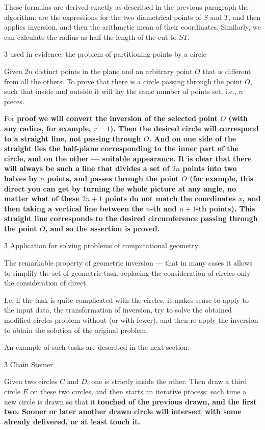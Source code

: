 These formulas are derived exactly as described in the previous paragraph the algorithm: are the expressions for the two diametrical points of $S$ and $T$, and then applies inversion, and then the arithmetic mean of their coordinates. Similarly, we can calculate the radius as half the length of the cut to $ST$.


\h3{ used in evidence: the problem of partitioning points by a circle }

Given $2n$ distinct points in the plane and an arbitrary point $O$ that is different from all the others. To prove that there is a circle passing through the point $O$, such that inside and outside it will lay the same number of points set, i.e., $n$ pieces.

For \bf{proof} we will convert the inversion of the selected point $O$ (with any radius, for example, $r=1$). Then the desired circle will correspond to a straight line, not passing through $O$. And on one side of the straight lies the half-plane corresponding to the inner part of the circle, and on the other --- suitable appearance. It is clear that there will always be such a line that divides a set of $2n$ points into two halves by $n$ points, and passes through the point $O$ (for example, this direct you can get by turning the whole picture at any angle, no matter what of these $2n+1$ points do not match the coordinates $x$, and then taking a vertical line between the $n$-th and $n+1$-th points). This straight line corresponds to the desired circumference passing through the point $O$, and so the assertion is proved.


\h3{ Application for solving problems of computational geometry }

The remarkable property of geometric inversion --- that in many cases it allows to simplify the set of geometric task, replacing the consideration of circles only the consideration of direct.

I.e. if the task is quite complicated with the circles, it makes sense to apply to the input data, the transformation of inversion, try to solve the obtained modified circles problem without (or with fewer), and then re-apply the inversion to obtain the solution of the original problem.

An example of such tasks are described in the next section.


\h3{ Chain Steiner }

Given two circles $C$ and $D$, one is strictly inside the other. Then draw a third circle $E$ on these two circles, and then starts an iterative process: each time a new circle is drawn so that it \bf{touched} of the previous drawn, and the first two. Sooner or later another drawn circle will intersect with some already delivered, or at least touch it.

